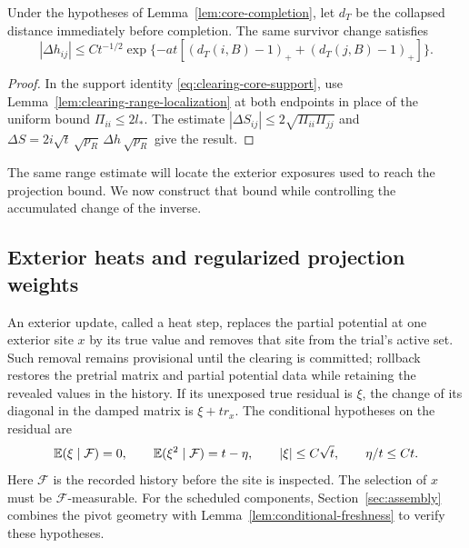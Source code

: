 \begin{corollary}\label{cor:core-decay}
Under the hypotheses of Lemma~\ref{lem:core-completion}, let $d_T$ be the
collapsed distance immediately before completion. The same survivor change
satisfies
\begin{equation}\label{eq:clearing-core-decay}
 |\Delta h_{ij}|\le Ct^{-1/2}
 \exp\{-at[(d_T(i,B)-1)_++(d_T(j,B)-1)_+]\}.
\end{equation}
\end{corollary}

\begin{proof}
In the support identity \eqref{eq:clearing-core-support}, use
Lemma~\ref{lem:clearing-range-localization} at both endpoints in place of
the uniform bound $\Pi_{ii}\le2l_*$. The estimate
$|\Delta S_{ij}|\le2\sqrt{\Pi_{ii}\Pi_{jj}}$ and
$\Delta S=2i\sqrt t\,\sqrt{p_R}\,\Delta h\,\sqrt{p_R}$ give the result.
\end{proof}

The same range estimate will locate the exterior exposures used to reach
the projection bound. We now construct that bound while controlling the
accumulated change of the inverse.

\subsection{Exterior heats and regularized projection weights}
\label{subsec:clearing-algebra}

An exterior update, called a heat step, replaces the
partial potential at one exterior site $x$ by its true value and removes that
site from the trial's active set. Such removal remains provisional until
the clearing is committed; rollback restores the pretrial matrix and partial
potential data while retaining the revealed values in the history.
If its unexposed true residual is $\xi$, the change
of its diagonal in the damped matrix is $\xi+tr_x$.  The conditional hypotheses
on the residual are
\begin{equation}\label{eq:clearing-residual}
 \mathbb E(\xi\mid\mathcal F)=0,\qquad
 \mathbb E(\xi^2\mid\mathcal F)=t-\eta,\qquad
 |\xi|\le C\sqrt t,\qquad \eta/t\le Ct.
\end{equation}
Here $\mathcal F$ is the recorded history before the site is inspected.  The
selection of $x$ must be $\mathcal F$-measurable. For the scheduled
components, Section~\ref{sec:assembly} combines the pivot geometry with
Lemma~\ref{lem:conditional-freshness} to verify these hypotheses.

